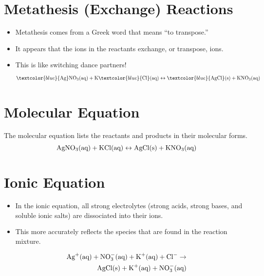 \documentclass[
	chapter=4
]{chem122notes}
\begin{document}
\section{Metathesis (Exchange) Reactions}\label{sec:metathesis-(exchange)-reactions}
\begin{itemize}
	\item Metathesis comes from a Greek word that means ``to transpose.''
	\item It appears that the ions in the reactants exchange, or transpose, ions.
	\item This is like switching dance partners!
	\[ \textcolor{blue}{\element{Ag}}\element{N}\element{O}[3] (\mbox{aq}) + \element{K}\textcolor{blue}{\element{Cl}} (\mbox{aq}) \leftrightarrow \textcolor{blue}{\element{Ag}\element{Cl}} (\mbox{s}) + \element{K}\element{N}\element{O}[3] (\mbox{aq}) \]
\end{itemize}

\section{Molecular Equation}\label{sec:molecular-equation}
The molecular equation lists the reactants and products in their molecular forms.
\[ \element{Ag}\element{N}\element{O}[3] (\mbox{aq}) + \element{K}\element{Cl} (\mbox{aq}) \leftrightarrow \element{Ag}\element{Cl} (\mbox{s}) + \element{K}\element{N}\element{O}[3] (\mbox{aq}) \]

\section{Ionic Equation}\label{sec:ionic-equation}
\begin{itemize}
	\item In the ionic equation, all strong electrolytes (strong acids, strong bases, and soluble ionic salts) are dissociated into their ions.
	\item This more accurately reflects the species that are found in the reaction mixture.
\end{itemize}

\begin{equation*}
\begin{aligned}
	\element{Ag}^{+} (\mbox{aq}) + \element{N}\element{O}[3]^{-} (\mbox{aq}) + \element{K}^{+} (\mbox{aq}) + \element{Cl}^{-} \rightarrow\\
	\element{Ag}\element{Cl} (\mbox{s}) + \element{K}^{+} (\mbox{aq}) + \element{N}\element{O}[3]^{-} (\mbox{aq})\\
\end{aligned}
\end{equation*}
\end{document}
